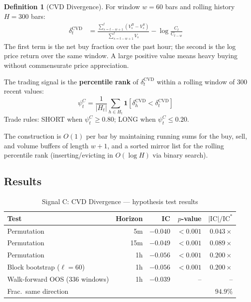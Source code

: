 \documentclass[12pt, a4paper]{article}
\theoremstyle{definition}
\newtheorem{definition}{Definition}[section]
\newcommand{\IC}{\mathrm{IC}}
\begin{document}
\begin{definition}[CVD Divergence]
  For window $w = 60$ bars and rolling history $H = 300$ bars:
  \begin{align}
    \delta_t^{\text{CVD}} &= \frac{\sum_{s=t-w+1}^{t}(V_s^B - V_s^S)}
                              {\sum_{s=t-w+1}^{t} V_s}
                           - \log\frac{C_t}{C_{t-w}}
  \end{align}
  The first term is the net buy fraction over the past hour; the second is
  the log price return over the same window. A large positive value means
  heavy buying without commensurate price appreciation.

  The trading signal is the \textbf{percentile rank} of $\delta_t^{\text{CVD}}$
  within a rolling window of 300 recent values:
  \[
    \psi_t^C = \frac{1}{|H_t|}\sum_{h \in H_t}
               \mathbf{1}[\delta_h^{\text{CVD}} < \delta_t^{\text{CVD}}]
  \]
  Trade rules: SHORT when $\psi_t^C \geq 0.80$; LONG when $\psi_t^C \leq 0.20$.
\end{definition}

The construction is $O(1)$ per bar by maintaining running sums for the buy,
sell, and volume buffers of length $w+1$, and a sorted mirror list for the
rolling percentile rank (inserting/evicting in $O(\log H)$ via binary search).

\subsection{Results}

\begin{table}[H]
\centering
\caption{Signal C: CVD Divergence — hypothesis test results}
\begin{tabular}{lrrrr}
\toprule
Test & Horizon & IC & $p$-value & $|\IC|/\IC^*$ \\
\midrule
Permutation & 5m  & $-0.040$ & $<0.001$ & $0.043\times$ \\
Permutation & 15m & $-0.049$ & $<0.001$ & $0.089\times$ \\
Permutation & 1h  & $-0.056$ & $<0.001$ & $0.200\times$ \\
Block bootstrap ($\ell=60$) & 1h & $-0.056$ & $<0.001$ & $0.200\times$ \\
\midrule
Walk-forward OOS (336 windows) & 1h & $-0.039$ & -- & -- \\
\quad Frac.\ same direction & & & & $94.9\%$ \\
\bottomrule
\end{tabular}
\end{table}
\end{document}
